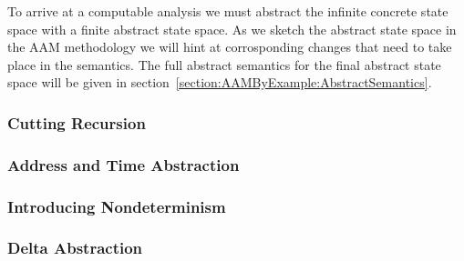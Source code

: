 To arrive at a computable analysis we must abstract the infinite concrete state
space with a finite abstract state space.
%
As we sketch the abstract state space in the AAM methodology we will hint at
corrosponding changes that need to take place in the semantics.
%
The full abstract semantics for the final abstract state space will be given in
section~\ref{section:AAMByExample:AbstractSemantics}.


\subsubsection{Cutting Recursion}


\subsubsection{Address and Time Abstraction}


\subsubsection{Introducing Nondeterminism}


\subsubsection{Delta Abstraction}

